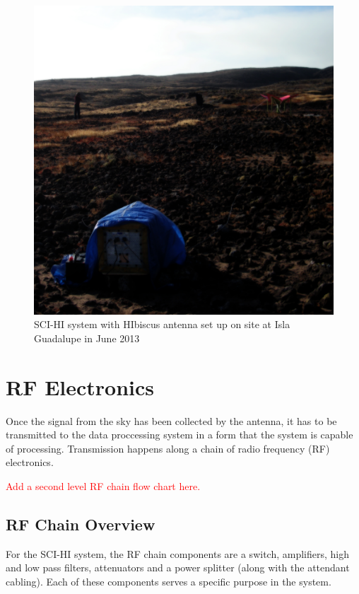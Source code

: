 \begin{figure}[htb]
\begin{center}
\includegraphics[width=0.85\linewidth]{SCIHI_system/figures/SCIHI_guad_sys.jpg}
\caption{SCI-HI system with HIbiscus antenna set up on site at Isla Guadalupe in June 2013}
\label{Fig:sys_guad}

\end{center}
\end{figure}


\section{RF Electronics}

Once the signal from the sky has been collected by the antenna, it has to be transmitted to the data proccessing system in a form that the system is capable of processing. Transmission happens along a chain of radio frequency (RF) electronics. 

\textcolor{red}{Add a second level RF chain flow chart here.}
\subsection{RF Chain Overview}
For the SCI-HI system, the RF chain components are a switch, amplifiers, high and low pass filters, attenuators and a power splitter (along with the attendant cabling). Each of these components serves a specific purpose in the system. 

